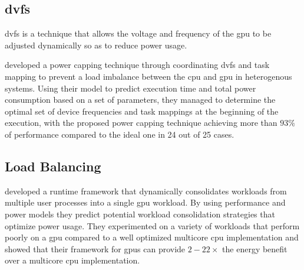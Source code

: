 		\subsection{\acrlong{dvfs}}
			\gls{dvfs} is a technique that allows the voltage and frequency of the \gls{gpu} to be adjusted dynamically so as to reduce power usage.

			\textcite{Komoda2013} developed a power capping technique through coordinating \gls{dvfs} and task mapping to prevent a load imbalance between the \gls{cpu} and \gls{gpu} in heterogenous systems.
			Using their model to predict execution time and total power consumption based on a set of parameters, they managed to determine the optimal set of device frequencies and task mappings at the beginning of the execution, with the proposed power capping technique achieving more than $93 \%$ of performance compared to the ideal one in 24 out of 25 cases.

			\textcite{}

		\subsection{Load Balancing}
			\textcite{Li2011} developed a runtime framework that dynamically consolidates workloads from multiple user processes into a single \gls{gpu} workload.
			By using performance and power models they predict potential workload consolidation strategies that optimize power usage.
			They experimented on a variety of workloads that perform poorly on a \gls{gpu} compared to a well optimized multicore \gls{cpu} implementation and showed that their framework for \glspl{gpu} can provide $2-22 \times$ the energy benefit over a multicore \gls{cpu} implementation.